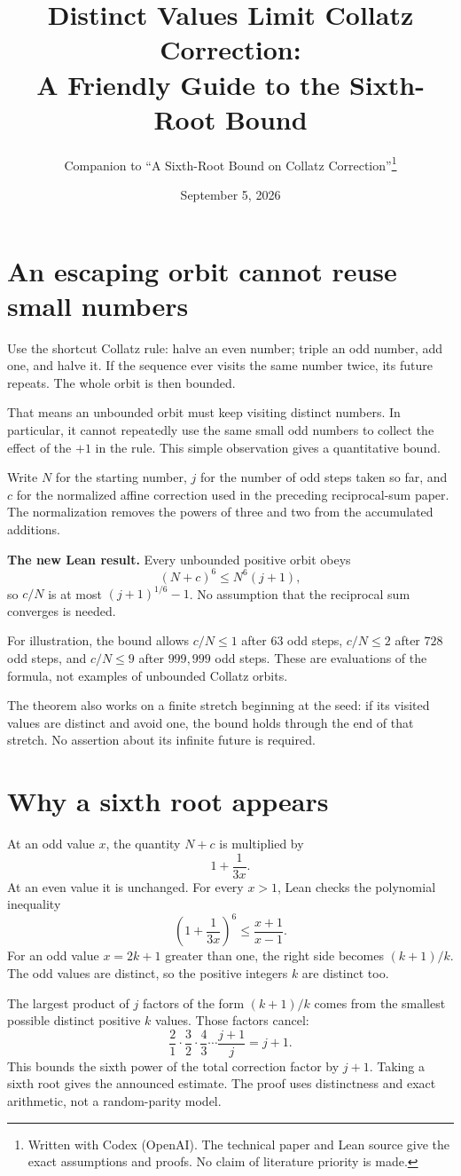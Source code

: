 \documentclass[11pt]{article}
\title{Distinct Values Limit Collatz Correction:\\
\Large A Friendly Guide to the Sixth-Root Bound}
\author{Companion to ``A Sixth-Root Bound on Collatz Correction''\thanks{Written with Codex (OpenAI). The technical paper and Lean source give the exact assumptions and proofs. No claim of literature priority is made.}}
\date{September 5, 2026}
\begin{document}
\maketitle
\section{An escaping orbit cannot reuse small numbers}
Use the shortcut Collatz rule: halve an even number; triple an odd number, add one, and halve it. If the sequence ever visits the same number twice, its future repeats. The whole orbit is then bounded.

That means an unbounded orbit must keep visiting distinct numbers. In particular, it cannot repeatedly use the same small odd numbers to collect the effect of the $+1$ in the rule. This simple observation gives a quantitative bound.

Write $N$ for the starting number, $j$ for the number of odd steps taken so far, and $c$ for the normalized affine correction used in the preceding reciprocal-sum paper. The normalization removes the powers of three and two from the accumulated additions.
\begin{keyidea}
\textbf{The new Lean result.} Every unbounded positive orbit obeys
\[
(N+c)^6\le N^6(j+1),
\]
so $c/N$ is at most $(j+1)^{1/6}-1$. No assumption that the reciprocal sum converges is needed.
\end{keyidea}
For illustration, the bound allows $c/N\le1$ after $63$ odd steps, $c/N\le2$ after $728$ odd steps, and $c/N\le9$ after $999{,}999$ odd steps. These are evaluations of the formula, not examples of unbounded Collatz orbits.

The theorem also works on a finite stretch beginning at the seed: if its visited values are distinct and avoid one, the bound holds through the end of that stretch. No assertion about its infinite future is required.

\newpage
\section{Why a sixth root appears}
At an odd value $x$, the quantity $N+c$ is multiplied by
\[
1+\frac1{3x}.
\]
At an even value it is unchanged. For every $x>1$, Lean checks the polynomial inequality
\[
\left(1+\frac1{3x}\right)^6\le\frac{x+1}{x-1}.
\]
For an odd value $x=2k+1$ greater than one, the right side becomes $(k+1)/k$. The odd values are distinct, so the positive integers $k$ are distinct too.

The largest product of $j$ factors of the form $(k+1)/k$ comes from the smallest possible distinct positive $k$ values. Those factors cancel:
\[
\frac21\cdot\frac32\cdot\frac43\cdots\frac{j+1}{j}=j+1.
\]
This bounds the sixth power of the total correction factor by $j+1$. Taking a sixth root gives the announced estimate. The proof uses distinctness and exact arithmetic, not a random-parity model.
\end{document}
